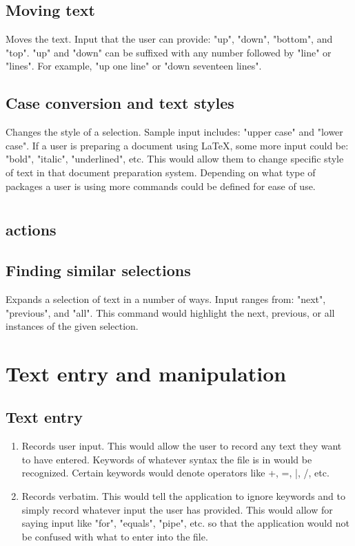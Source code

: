 \documentclass[11pt, oneside]{article}
\begin{document}
	\subsection{Moving text}
	Moves the text. Input that the user can provide: "up", "down", "bottom", and "top". "up" and "down" can be suffixed with any number followed by "line" or "lines". For example, "up one line" or "down seventeen lines".

	\subsection{Case conversion and text styles}
	Changes the style of a selection. Sample input includes: "upper case" and "lower case". If a user is preparing a document using \LaTeX, some more input could be: "bold", "italic", "underlined", etc. This would allow them to change specific style of text in that document preparation system. Depending on what type of packages a user is using more commands could be defined for ease of use.

\section{}

	\subsection{ actions}

	\subsection{Finding similar selections}
	Expands a selection of text in a number of ways. Input ranges from: "next", "previous", and "all". This command would highlight the next, previous, or all instances of the given selection.

\section{Text entry and manipulation}

	\subsection{Text entry}
	\begin{enumerate}
	\item {}
	Records user input. This would allow the user to record any text they want to have entered. Keywords of whatever syntax the file is in would be recognized. Certain keywords would denote operators like +, =, |, /, etc.

	\item {}
	Records verbatim. This would tell the application to ignore keywords and to simply record whatever input the user has provided. This would allow for saying input like "for", "equals", "pipe", etc. so that the application would not be confused with what to enter into the file.
	\end{enumerate}
\end{document}

